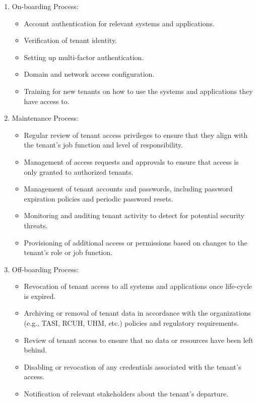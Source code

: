 \begin{enumerate}
    \item On-boarding Process:
        \begin{itemize}
            \item Account authentication for relevant systems and applications.
            \item Verification of tenant identity.
            \item Setting up multi-factor authentication.
            \item Domain and network access configuration.
            \item Training for new tenants on how to use the systems and applications they have access to.
        \end{itemize}
    \item Maintenance Process:
        \begin{itemize}
            \item Regular review of tenant access privileges to ensure that they align with the tenant's job function and level of responsibility.
            \item Management of access requests and approvals to ensure that access is only granted to authorized tenants.
            \item Management of tenant accounts and passwords, including password expiration policies and periodic password resets.
            \item Monitoring and auditing tenant activity to detect for potential security threats.
            \item Provisioning of additional access or permissions based on changes to the tenant's role or job function.
        \end{itemize}
    \item Off-boarding Process:
        \begin{itemize}
            \item Revocation of tenant access to all systems and applications once life-cycle is expired. 
            \item Archiving or removal of tenant data in accordance with the organizations (e.g., TASI, RCUH, UHM, etc.) policies and regulatory requirements.
            \item Review of tenant access to ensure that no data or resources have been left behind.
            \item Disabling or revocation of any credentials associated with the tenant's access.
            \item Notification of relevant stakeholders about the tenant's departure.
        \end{itemize}
\end{enumerate}

